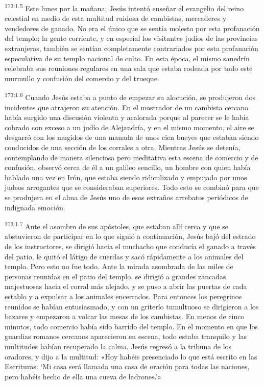 \par 
\textsuperscript{173:1.5} Este lunes por la mañana, Jesús intentó enseñar el evangelio del reino celestial en medio de esta multitud ruidosa de cambistas, mercaderes y vendedores de ganado. No era el único que se sentía molesto por esta profanación del templo; la gente corriente, y en especial los visitantes judíos de las provincias extranjeras, también se sentían completamente contrariados por esta profanación especulativa de su templo nacional de culto. En esta época, el mismo sanedrín celebraba sus reuniones regulares en una sala que estaba rodeada por todo este murmullo y confusión del comercio y del trueque.

\par 
\textsuperscript{173:1.6} Cuando Jesús estaba a punto de empezar su alocución, se produjeron dos incidentes que atrajeron su atención. En el mostrador de un cambista cercano había surgido una discusión violenta y acalorada porque al parecer se le había cobrado con exceso a un judío de Alejandría, y en el mismo momento, el aire se desgarró con los mugidos de una manada de unos cien bueyes que estaban siendo conducidos de una sección de los corrales a otra. Mientras Jesús se detenía, contemplando de manera silenciosa pero meditativa esta escena de comercio y de confusión, observó cerca de él a un galileo sencillo, un hombre con quien había hablado una vez en Irón, que estaba siendo ridiculizado y empujado por unos judeos arrogantes que se consideraban superiores. Todo esto se combinó para que se produjera en el alma de Jesús uno de esos extraños arrebatos periódicos de indignada emoción.

\par 
\textsuperscript{173:1.7} Ante el asombro de sus apóstoles, que estaban allí cerca y que se abstuvieron de participar en lo que siguió a continuación, Jesús bajó del estrado de los instructores, se dirigió hacia el muchacho que conducía el ganado a través del patio, le quitó el látigo de cuerdas y sacó rápidamente a los animales del templo. Pero esto no fue todo. Ante la mirada asombrada de las miles de personas reunidas en el patio del templo, se dirigió a grandes zancadas majestuosas hacia el corral más alejado, y se puso a abrir las puertas de cada establo y a expulsar a los animales encerrados. Para entonces los peregrinos reunidos se habían entusiasmado, y con un griterío tumultuoso se dirigieron a los bazares y empezaron a volcar las mesas de los cambistas. En menos de cinco minutos, todo comercio había sido barrido del templo. En el momento en que los guardias romanos cercanos aparecieron en escena, todo estaba tranquilo y las multitudes habían recuperado la calma. Jesús regresó a la tribuna de los oradores, y dijo a la multitud: «Hoy habéis presenciado lo que está escrito en las Escrituras: `Mi casa será llamada una casa de oración para todas las naciones, pero habéis hecho de ella una cueva de ladrones.'»

